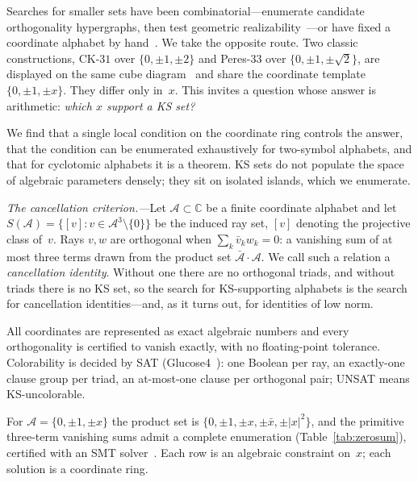 \documentclass[twocolumn,prl,superscriptaddress,nofootinbib]{revtex4-2}
\newcommand{\C}{\mathbb{C}}
\newcommand{\CK}{\mathrm{CK}\text{-}31}
\begin{document}
Searches for smaller sets have been combinatorial---enumerate candidate
orthogonality hypergraphs, then test geometric realizability~\cite{LiBrightGanesh2024,KirchwegarPeitlSzeider2023}---or
have fixed a coordinate alphabet by hand~\cite{Peres1991,Pavicic2004}.  We take
the opposite route.  Two classic constructions, $\CK$ over $\{0,\pm1,\pm2\}$ and
Peres-33 over $\{0,\pm1,\pm\sqrt2\}$, are displayed on the same cube
diagram~\cite{Peres1993} and share the coordinate template $\{0,\pm1,\pm x\}$.
They differ only in~$x$.  This invites a question whose answer is arithmetic:
\emph{which $x$ support a KS set?}

We find that a single local condition on the coordinate ring controls the answer,
that the condition can be enumerated exhaustively for two-symbol alphabets, and
that for cyclotomic alphabets it is a theorem.  KS sets do not populate the space
of algebraic parameters densely; they sit on isolated islands, which we
enumerate.

\textit{The cancellation criterion.---}Let $\mathcal{A} \subset \C$ be a finite
coordinate alphabet and let $S(\mathcal{A}) = \{[v] : v \in
\mathcal{A}^3\setminus\{0\}\}$ be the induced ray set, $[v]$ denoting the
projective class of~$v$.  Rays $v,w$ are orthogonal when
$\sum_k \bar v_k w_k = 0$: a vanishing sum of at most three terms drawn from the
product set $\bar{\mathcal{A}}\cdot\mathcal{A}$.  We call such a relation a
\emph{cancellation identity}.  Without one there are no orthogonal triads, and
without triads there is no KS set, so the search for KS-supporting alphabets is
the search for cancellation identities---and, as it turns out, for identities of
low norm.

All coordinates are represented as exact algebraic numbers and every
orthogonality is certified to vanish exactly, with no floating-point tolerance.
Colorability is decided by SAT (Glucose4~\cite{AudemardSimon2018}): one Boolean
per ray, an exactly-one clause group per triad, an at-most-one clause per
orthogonal pair; UNSAT means KS-uncolorable.

For $\mathcal{A} = \{0,\pm1,\pm x\}$ the product set is
$\{0,\pm1,\pm x,\pm\bar x,\pm|x|^2\}$, and the primitive three-term vanishing
sums admit a complete enumeration (Table~\ref{tab:zerosum}), certified with an
SMT solver~\cite{deMouraBjorner2008}.  Each row is an algebraic constraint
on~$x$; each solution is a coordinate ring.
\end{document}
